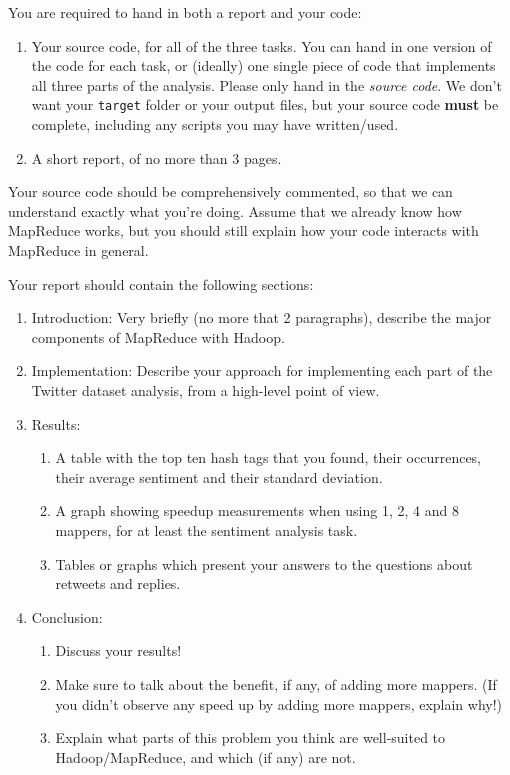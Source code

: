 \documentclass[a4paper,10pt]{article}
\begin{document}
  You are required to hand in both a report and your code:
  
  \begin{enumerate}
    \item Your source code, for all of the three tasks. You can hand in one version of the code for each task, or (ideally) one single piece of code that implements all three parts of the analysis. Please only hand in the \emph{source code}. We don't want your \texttt{target} folder or your output files, but your source code \textbf{must} be complete, including any scripts you may have written/used.
    \item A short report, of no more than 3 pages.
  \end{enumerate}

  Your source code should be comprehensively commented, so that we can understand exactly what you're doing. Assume that we already know how
  MapReduce works, but you should still explain how your code interacts with MapReduce in general.
  
  Your report should contain the following sections:
  
  \begin{enumerate}
    \item Introduction: Very briefly (no more that 2 paragraphs), describe the major components of MapReduce with Hadoop.
    \item Implementation: Describe your approach for implementing each part of the Twitter dataset analysis, from a high-level point of view.
    \item Results: 
    \begin{enumerate}
      \item A table with the top ten hash tags that you found, their occurrences, their average sentiment and their standard deviation.
      \item A graph showing speedup measurements when using 1, 2, 4 and 8 mappers, for at least the sentiment analysis task.
      \item Tables or graphs which present your answers to the questions about retweets and replies.
    \end{enumerate}
    \item Conclusion: 
    \begin{enumerate}
      \item Discuss your results!
      \item Make sure to talk about the benefit, if any, of adding more mappers.
	      (If you didn't observe any speed up by adding more mappers, explain why!)
      \item Explain what parts of this problem you think are well-suited to Hadoop/MapReduce, and which (if any) are not.
    \end{enumerate}
    
  \end{enumerate}
  
\end{document}
